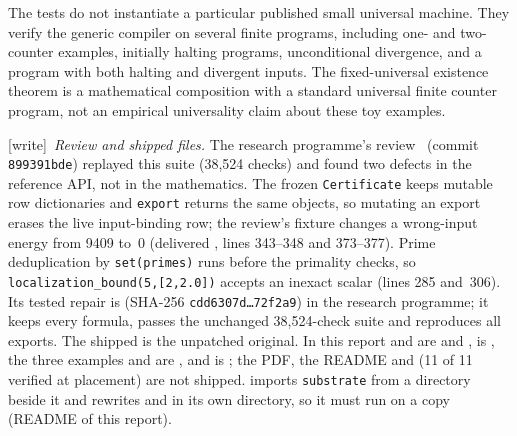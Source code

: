 \documentclass[11pt,letterpaper]{article}
\theoremstyle{definition}
\theoremstyle{remark}
\newcommand{\wtag}{\textup{[write]}}
\begin{document}
The tests do not instantiate a particular published small universal
machine. They verify the generic compiler on several finite programs,
including one- and two-counter examples, initially halting programs,
unconditional divergence, and a program with both halting and divergent
inputs. The fixed-universal existence theorem is a mathematical composition
with a standard universal finite counter program, not an empirical
universality claim about these toy examples.

\wtag\ \emph{Review and shipped files.} The research programme's review~\cite{reviewCG} (commit \texttt{899391bde}) replayed this suite (38,524 checks) and found two defects in the reference API, not in the mathematics. The frozen \texttt{Certificate} keeps mutable row dictionaries and \texttt{export} returns the same objects, so mutating an export erases the live input-binding row; the review's fixture changes a wrong-input energy from 9409 to~0 (delivered , lines 343--348 and 373--377). Prime deduplication by \texttt{set(primes)} runs before the primality checks, so \texttt{localization\_bound(5,[2,2.0])} accepts an inexact scalar (lines 285 and~306). Its tested repair is  (SHA-256 \texttt{cdd6307d\ldots72f2a9}) in the research programme; it keeps every formula, passes the unchanged 38,524-check suite and reproduces all exports. The shipped  is the unpatched original. In this report  and  are  and ,  is , the three examples and  are , and  is ; the PDF, the README and  (11 of 11 verified at placement) are not shipped.  imports \texttt{substrate} from a  directory beside it and rewrites  and  in its own directory, so it must run on a copy (README of this report).
\end{document}
